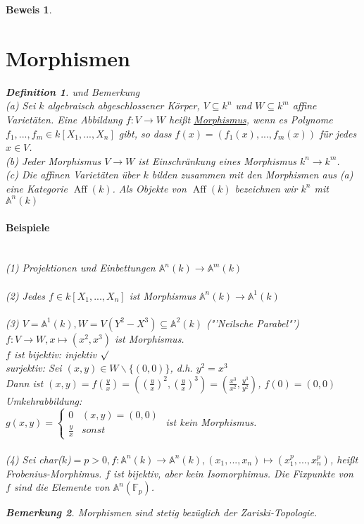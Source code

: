 \documentclass[a4paper,12pt]{report}
\theoremstyle{break}
\newtheorem{Def}{Definition}[chapter]
\newtheorem{Bem}[Def]{Bemerkung}
\theoremstyle{nonumberbreak}
\newtheorem{Bew}{Beweis}
\theoremstyle{nonumberplain}
\begin{document}
\begin{Bew}
\section{Morphismen}
\begin{Def} und Bemerkung\\
(a) Sei $k$ algebraisch abgeschlossener Körper, $V\subseteq k^n$ und $W\subseteq k^m$ affine Varietäten. Eine Abbildung $f:V\rightarrow W$ heißt \underline{Morphismus}, wenn es Polynome $f_1,...,f_m\in k[X_1,...,X_n]$ gibt, so dass $f(x)=(f_1(x),...,f_m(x))$ für jedes $x\in V$.\\
(b) Jeder Morphismus $V\rightarrow W$ ist Einschränkung eines Morphismus $k^n\rightarrow k^m$.\\
(c) Die affinen Varietäten über $k$ bilden zusammen mit den Morphismen aus (a) eine Kategorie $\operatorname{Aff}(k)$. Als Objekte von $\operatorname{Aff}(k)$ bezeichnen wir $k^n$ mit $\mathbb{A}^n(k)$ 
\end{Def}
\paragraph{Beispiele}~\\
(1) Projektionen und Einbettungen $\mathbb{A}^n(k) \rightarrow\mathbb{A}^m(k)$\\\\
(2) Jedes $f\in k[X_1,...,X_n]$ ist Morphismus $\mathbb{A}^n(k)\rightarrow\mathbb{A}^1(k)$\\\\
(3) $V= \mathbb{A}^1(k), W=V(Y^2-X^3)\subseteq \mathbb{A}^2(k)$ ("'Neilsche Parabel"')\\
$f: V\rightarrow W, x\mapsto (x^2,x^3)$ ist Morphismus.\\
$f$ ist bijektiv: injektiv $\surd$\\
surjektiv: Sei $(x,y)\in W\backslash\{(0,0)\}$, d.h. $y^2=x^3$\\
Dann ist $(x,y)= f(\frac{y}{x})= ((\frac{y}{x})^2,(\frac{y}{x})^3)=(\frac{x^3}{x^2},\frac{y^3}{y^2})$, $f(0) = (0,0)$\\
Umkehrabbildung:\\
$g(x,y)=\begin{cases}
0&(x,y)=(0,0)\\
\frac{y}{x}&sonst
\end{cases}$
ist kein Morphismus.\\\\
(4) Sei char($k$)$=p>0, f:\mathbb{A}^n(k)\rightarrow\mathbb{A}^n(k), (x_1,...,x_n)\mapsto (x_1^p,...,x_n^p)$, heißt Frobenius-Morphimus. $f$ ist bijektiv, aber kein Isomorphimus. Die Fixpunkte von $f$ sind die Elemente von $\mathbb{A}^n(\mathbb{F}_p)$.
\begin{Bem}
Morphismen sind stetig bezüglich der Zariski-Topologie.
\end{Bem}

\end{Bew}
\end{document}
